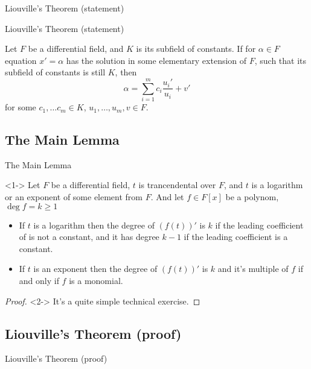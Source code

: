 \documentclass[8pt]{beamer}
\renewcommand{\|}{\ensuremath{\hspace{0.1cm} | \hspace{0.1cm}}}
\renewcommand{\ge}{\geqslant}
\begin{document}
    \begin{section}{Liouville's Theorem (statement)}
    \begin{frame}{Liouville's Theorem (statement)}
        \begin{theorem}[Liouville, 1833-1841]
            Let $F$ be a differential field, and $K$ is its subfield of constants. 
            If for $\alpha\in F$ equation $x' = \alpha$ has the solution in some elementary extension of $F$, such that its subfield of constants is still $K$, then
            \[
                \alpha = \sum\limits_{i=1}^m c_i \frac{u_i'}{u_i} + v'
            \]
            for some $c_1, \ldots c_m \in K$, $u_1, \ldots, u_m, v \in F$.
        \end{theorem}
    \end{frame}

    \section{The Main Lemma}
    \begin{frame}{The Main Lemma}
        \begin{lemma}<1->
            Let $F$ be a differential field, $t$ is trancendental over $F$, and $t$ is a logarithm or an exponent of some element from $F$. 
            And let $f\in F[x]$ be a polynom, $\deg{f} = k \ge 1$
            \begin{itemize}
                \item If $t$ is a logarithm then the degree of $(f(t))'$ is $k$ if the leading coefficient of is not a constant, and it has degree $k-1$ if  the leading coefficient is a constant.
                \item If $t$ is an exponent then the degree of $(f(t))'$ is $k$ and it's multiple of $f$ if and only if $f$ is a monomial.
            \end{itemize}
        \end{lemma}

        \begin{proof}<2->
            It's a quite simple technical exercise.
        \end{proof}
    \end{frame}

    \section{Liouville's Theorem (proof)}
    \begin{frame}{Liouville's Theorem (proof)}
\end{frame}
\end{section}
\end{document}
